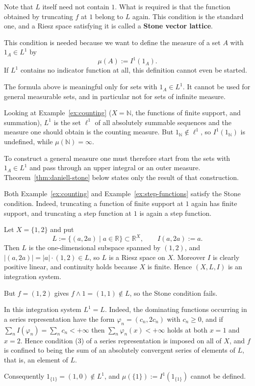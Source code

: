 \noindent
Note that $L$ itself need not contain $1$.
What is required is that the function obtained by truncating $f$ at $1$ belong to
$L$ again.
This condition is the standard one, and a Riesz space satisfying it is called a
\textbf{Stone vector lattice}.

This condition is needed because we want to define the measure of a set $A$ with
$1_A\in L^1$ by
\[
  \mu(A):=I^1(1_A) .
\]
If $L^1$ contains no indicator function at all, this definition cannot even be
started.

\begin{remark}\label{rem:mu-only-on-finite}
  The formula above is meaningful only for sets with $1_A\in L^1$.
  It cannot be used for general measurable sets, and in particular not for sets
  of infinite measure.

  Looking at Example~\ref{ex:counting} ($X=\mathbb{N}$, the functions of finite
  support, and summation), $L^1$ is the set $\ell^1$ of all absolutely summable
  sequences and the measure one should obtain is the counting measure.
  But $1_{\mathbb{N}}\notin\ell^1$, so $I^1(1_{\mathbb{N}})$ is undefined, while
  $\mu(\mathbb{N})=\infty$.

  To construct a general measure one must therefore start from the sets with
  $1_A\in L^1$ and pass through an upper integral or an outer measure.
  Theorem~\ref{thm:daniell-stone} below states only the result of that
  construction.
\end{remark}

\begin{example}\label{ex:stone-holds}
  Both Example~\ref{ex:counting} and Example~\ref{ex:step-functions} satisfy the
  Stone condition.
  Indeed, truncating a function of finite support at $1$ again has finite
  support, and truncating a step function at $1$ is again a step function.
\end{example}

\begin{example}\label{ex:stone-fails}
  Let $X=\{1,2\}$ and put
  \[
    L:=\{(a,2a)\mid a\in\mathbb{R}\}\subset\mathbb{R}^X,
    \qquad
    I(a,2a):=a .
  \]
  Then $L$ is the one-dimensional subspace spanned by $(1,2)$, and
  $|(a,2a)|=|a|\cdot(1,2)\in L$, so $L$ is a Riesz space on $X$.
  Moreover $I$ is clearly positive linear, and continuity holds because $X$ is
  finite.
  Hence $(X,L,I)$ is an integration system.

  But $f=(1,2)$ gives $f\wedge1=(1,1)\notin L$, so the Stone condition fails.

  In this integration system $L^1=L$.
  Indeed, the dominating functions occurring in a series representation have the
  form $\varphi_n=(c_n,2c_n)$ with $c_n\ge0$, and if
  $\sum_nI(\varphi_n)=\sum_nc_n<+\infty$ then $\sum_n\varphi_n(x)<+\infty$ holds
  at both $x=1$ and $x=2$.
  Hence condition (3) of a series representation is imposed on all of $X$, and
  $f$ is confined to being the sum of an absolutely convergent series of
  elements of $L$, that is, an element of $L$.

  Consequently $1_{\{1\}}=(1,0)\notin L^1$, and $\mu(\{1\}):=I^1(1_{\{1\}})$
  cannot be defined.
\end{example}

